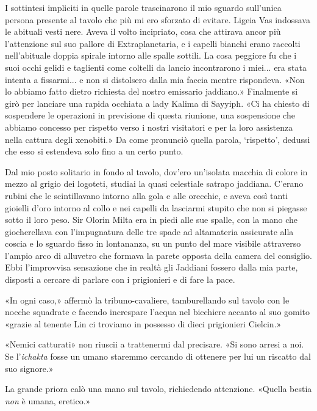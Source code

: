 I sottintesi impliciti in quelle parole trascinarono il mio sguardo
sull'unica persona presente al tavolo che più mi ero sforzato di
evitare. Ligeia Vas indossava le abituali vesti nere. Aveva il volto
incipriato, cosa che attirava ancor più l'attenzione sul suo pallore di
Extraplanetaria, e i capelli bianchi erano raccolti nell'abituale doppia
spirale intorno alle spalle sottili. La cosa peggiore fu che i suoi
occhi gelidi e taglienti come coltelli da lancio incontrarono i miei...
era stata intenta a fissarmi... e non si distolsero dalla mia faccia
mentre rispondeva. «Non lo abbiamo fatto dietro richiesta del nostro
emissario jaddiano.» Finalmente si girò per lanciare una rapida occhiata
a lady Kalima di Sayyiph. «Ci ha chiesto di sospendere le operazioni in
previsione di questa riunione, una sospensione che abbiamo concesso per
rispetto verso i nostri visitatori e per la loro assistenza nella
cattura degli xenobiti.» Da come pronunciò quella parola, `rispetto',
dedussi che esso si estendeva solo fino a un certo punto.

Dal mio posto solitario in fondo al tavolo, dov'ero un'isolata macchia
di colore in mezzo al grigio dei logoteti, studiai la quasi celestiale
satrapo jaddiana. C'erano rubini che le scintillavano intorno alla gola
e alle orecchie, e aveva così tanti gioielli d'oro intorno al collo e
nei capelli da lasciarmi stupito che non si piegasse sotto il loro peso.
Sir Olorin Milta era in piedi alle sue spalle, con la mano che
giocherellava con l'impugnatura delle tre spade ad altamateria
assicurate alla coscia e lo sguardo fisso in lontananza, su un punto del
mare visibile attraverso l'ampio arco di alluvetro che formava la parete
opposta della camera del consiglio. Ebbi l'improvvisa sensazione che in
realtà gli Jaddiani fossero dalla mia parte, disposti a cercare di
parlare con i prigionieri e di fare la pace.

«In ogni caso,» affermò la tribuno-cavaliere, tamburellando sul tavolo
con le nocche squadrate e facendo increspare l'acqua nel bicchiere
accanto al suo gomito «grazie al tenente Lin ci troviamo in possesso di
dieci prigionieri Cielcin.»

«Nemici catturati» non riuscii a trattenermi dal precisare. «Si sono
arresi a noi. Se l'\emph{ichakta} fosse un umano staremmo cercando di
ottenere per lui un riscatto dal suo signore.»

La grande priora calò una mano sul tavolo, richiedendo attenzione.
«Quella bestia \emph{non} è umana, eretico.»

